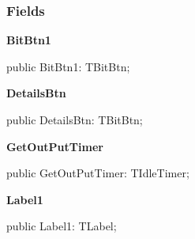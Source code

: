\documentclass{report}
\newif\ifpdf
\begin{document}
\subsubsection*{\large{\textbf{Fields}}\normalsize\hspace{1ex}\hfill}
\begin{list}{}{
\setlength{\itemindent}{0cm}
\setlength{\listparindent}{0cm}
\setlength{\leftmargin}{\evensidemargin}
\addtolength{\leftmargin}{\tmplength}
\settowidth{\labelsep}{X}
\addtolength{\leftmargin}{\labelsep}
\setlength{\labelwidth}{\tmplength}
}
\label{uninstall.TRMForm-BitBtn1}
\item[\textbf{BitBtn1}\hfill]
\ifpdf
\begin{flushleft}
\fi
\begin{ttfamily}
public BitBtn1: TBitBtn;\end{ttfamily}

\ifpdf
\end{flushleft}
\fi


\par  \label{uninstall.TRMForm-DetailsBtn}
\item[\textbf{DetailsBtn}\hfill]
\ifpdf
\begin{flushleft}
\fi
\begin{ttfamily}
public DetailsBtn: TBitBtn;\end{ttfamily}

\ifpdf
\end{flushleft}
\fi


\par  \label{uninstall.TRMForm-GetOutPutTimer}
\item[\textbf{GetOutPutTimer}\hfill]
\ifpdf
\begin{flushleft}
\fi
\begin{ttfamily}
public GetOutPutTimer: TIdleTimer;\end{ttfamily}

\ifpdf
\end{flushleft}
\fi


\par  \label{uninstall.TRMForm-Label1}
\item[\textbf{Label1}\hfill]
\ifpdf
\begin{flushleft}
\fi
\begin{ttfamily}
public Label1: TLabel;\end{ttfamily}

\ifpdf
\end{flushleft}
\fi



\end{list}
\end{document}
